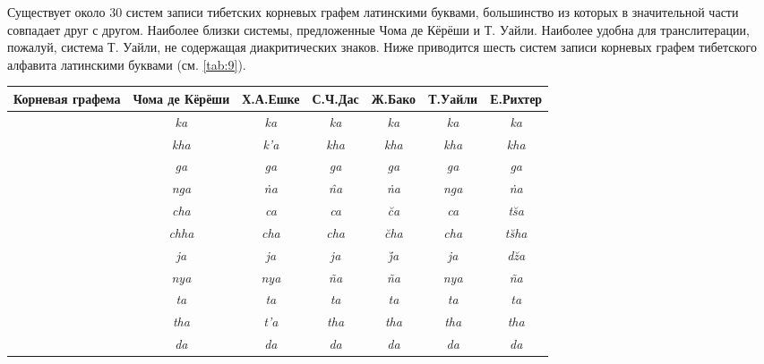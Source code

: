 Существует около 30 систем записи тибетских корневых графем латинскими буквами, большинство из которых в значительной части совпадает друг с другом. Наиболее близки системы, предложенные Чома де Кёрёши и Т. Уайли. Наиболее удобна для транслитерации, пожалуй, система Т. Уайли, не содержащая диакритических знаков. Ниже приводится шесть систем записи корневых графем тибетского алфавита латинскими буквами (см. \ref{tab:9}).

\begin{tabularx}{\textwidth}{*{7}c}
	\caption{Системы транслитерации корневых графем}\label{tab:9}\\
	\toprule
	\parbox[m]{0.12\textwidth}{\small\centering Корневая графема} & \parbox[m]{0.12\textwidth}{\small\centering Чома де Кёрёши} & \parbox[m]{0.12\textwidth}{\small\centering Х.А.Ешке} & \parbox[m]{0.12\textwidth}{\small\centering С.Ч.Дас} & \parbox[m]{0.12\textwidth}{\small\centering Ж.Бако} & \parbox[m]{0.12\textwidth}{\small\centering Т.Уайли} & \parbox[m]{0.12\textwidth}{\small\centering Е.Рихтер}\\
	\midrule
	\endhead
	 & \textit{ka} & \textit{ka} & \textit{ka} & \textit{ka} & \textit{ka} & \textit{ka}\\
	 & \textit{kha} & \textit{k'a} & \textit{kha} & \textit{kha} & \textit{kha} & \textit{kha}\\
	 & \textit{ga} & \textit{ga} & \textit{ga} & \textit{ga} & \textit{ga} & \textit{ga}\\
	 & \textit{nga} & \textit{\.{n}a} & \textit{\^{n}a} & \textit{\.{n}a} & \textit{nga} & \textit{\.{n}a}\\
	 & \textit{cha} & \textit{ca} & \textit{ca} & \textit{\u{c}a} & \textit{ca} & \textit{t\u{s}a}\\ 
	 & \textit{chha} & \textit{cha} & \textit{cha} & \textit{\u{c}ha} & \textit{cha} & \textit{t\u{s}ha}\\ 
	 & \textit{ja} & \textit{ja} & \textit{ja} & \textit{\u{j}a} & \textit{ja} & \textit{d\u{z}a}\\ 
	 & \textit{nya} & \textit{nya} & \textit{\~{n}a} & \textit{\~{n}a} & \textit{nya} & \textit{\~{n}a}\\ 
	 & \textit{ta} & \textit{ta} & \textit{ta} & \textit{ta} & \textit{ta} & \textit{ta}\\
	 & \textit{tha} & \textit{t'a} & \textit{tha} & \textit{tha} & \textit{tha} & \textit{tha}\\
	 & \textit{da} & \textit{da} & \textit{da} & \textit{da} & \textit{da} & \textit{da}\\

\end{tabularx}
